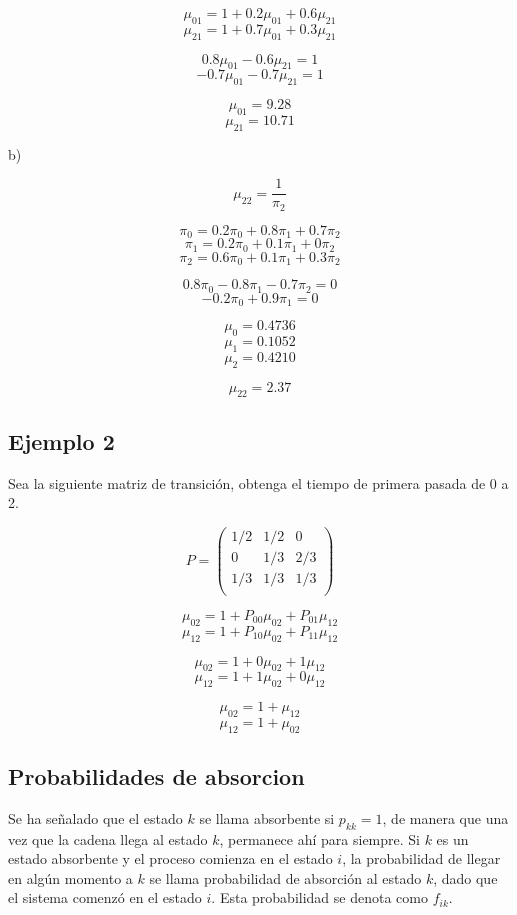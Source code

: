 \documentclass{article}
\begin{document}
\[\mu_{01} = 1 + 0.2\mu_{01} + 0.6\mu_{21}\]
\[\mu_{21} = 1 + 0.7\mu_{01} + 0.3\mu_{21}\]

\[0.8\mu_{01} - 0.6\mu_{21} = 1\]
\[-0.7\mu_{01} - 0.7\mu_{21} = 1\]

\[\mu_{01} = 9.28\]
\[\mu_{21} = 10.71\]

b)

\[\mu_{22} = \frac{1}{\pi_2}\]

\[\pi_{0} = 0.2\pi_{0} + 0.8\pi_{1} + 0.7\pi_{2}\]
\[\pi_{1} = 0.2\pi_{0} + 0.1\pi_{1} + 0\pi_{2}\]
\[\pi_{2} = 0.6\pi_{0} + 0.1\pi_{1} + 0.3\pi_{2}\]

\[0.8\pi_0 - 0.8\pi_1 -0.7\pi_2 = 0\]
\[-0.2\pi_0 + 0.9\pi_1 = 0\]

\[\mu_0 = 0.4736\]
\[\mu_1 = 0.1052\]
\[\mu_2 = 0.4210\]

\[\mu_{22} = 2.37\]

\subsection*{Ejemplo 2}

Sea la siguiente matriz de transición, obtenga el tiempo de primera pasada de 0 a 2.

\[
    P = \begin{pmatrix}
        1/2 & 1/2 & 0   \\
        0   & 1/3 & 2/3 \\
        1/3 & 1/3 & 1/3 \\
    \end{pmatrix}
\]

\[\mu_{02} = 1 + P_{00}\mu_{02} + P_{01}\mu_{12}\]
\[\mu_{12} = 1 + P_{10}\mu_{02} + P_{11}\mu_{12}\]

\[\mu_{02} = 1 + 0\mu_{02} + 1\mu_{12}\]
\[\mu_{12} = 1 + 1\mu_{02} + 0\mu_{12}\]

\[\mu_{02} = 1 + \mu_{12}\]
\[\mu_{12} = 1 + \mu_{02}\]

\subsection{Probabilidades de absorcion}

Se ha señalado que el estado $k$ se llama absorbente si $p_{kk} = 1$, de manera que una vez que la cadena llega al estado $k$, permanece ahí para siempre. Si $k$ es un estado absorbente y el proceso comienza en el estado $i$, la probabilidad de llegar en algún momento a $k$ se llama probabilidad de absorción al estado $k$, dado que el sistema comenzó en el estado $i$. Esta probabilidad se denota como $f_{ik}$.
\end{document}
